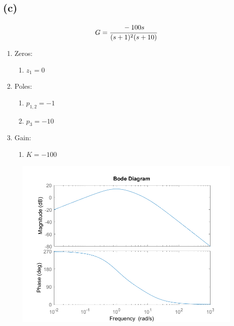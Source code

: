 \documentclass[letter]{article}
\numberwithin{equation}{section}
\begin{document}
\subsection{(c)}
\[
	G = \cfrac{
		-100 s
	}{
		(s+1)^2 (s+10)
	}
\]
\begin{enumerate}
	\item Zeros:
	\begin{enumerate}
		\item $z_1 = 0$
	\end{enumerate}
	\item Poles:
	\begin{enumerate}
		\item $p_{1,2} = -1$
		\item $p_3 = -10$
	\end{enumerate}
	\item Gain:
	\begin{enumerate}
		\item $K = -100$
	\end{enumerate}
\end{enumerate}

\begin{figure}[h!]
	\centering
	\includegraphics[width=\textwidth]{figs/pblm2c.png}
\end{figure}


\newpage
\end{document}
